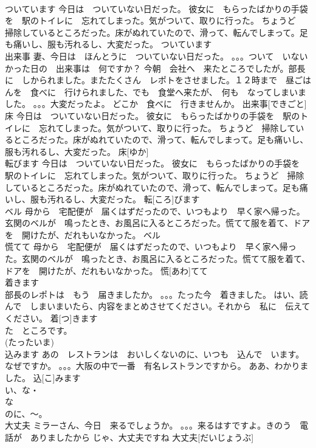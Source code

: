\documentclass[8pt]{extreport}
\begin{document}
\begin{CJK}{UTF8}{min}
\\	ついています	今日は　ついていない日だった。 彼女に　もらったばかりの手袋を　駅のトイレに　忘れてしまった。気がついて、取りに行った。 ちょうど　掃除しているところだった。床がぬれていたので、滑って、転んでしまって。足も痛いし、服も汚れるし、大変だった。	ついています						
\\	出来事	妻、今日は　ほんとうに　ついていない日だった。 。。。ついて　いないかった日の　出来事は　何ですか？ 今朝　会社へ　来たところでしたが。部長に　しかられました。またたくさん　レポトをさせました。１２時まで　昼ごはんを　食べに　行けられました、でも　食堂へ来たが、　何も　なってしまいました。 。。。大変だったよ。 どこか　食べに　行きませんか。	出来事[できごと]			
\\	床	今日は　ついていない日だった。 彼女に　もらったばかりの手袋を　駅のトイレに　忘れてしまった。気がついて、取りに行った。 ちょうど　掃除しているところだった。床がぬれていたので、滑って、転んでしまって。足も痛いし、服も汚れるし、大変だった。	床[ゆか]					
\\	転びます	今日は　ついていない日だった。 彼女に　もらったばかりの手袋を　駅のトイレに　忘れてしまった。気がついて、取りに行った。 ちょうど　掃除しているところだった。床がぬれていたので、滑って、転んでしまって。足も痛いし、服も汚れるし、大変だった。	転[ころ]びます					
\\	ベル	母から　宅配便が　届くはずだったので、いつもより　早く家へ帰った。玄関のベルが　鳴ったとき、お風呂に入るところだった。慌てて服を着て、ドアを　開けたが、だれもいなかった。	ベル						
\\	慌てて	母から　宅配便が　届くはずだったので、いつもより　早く家へ帰った。玄関のベルが　鳴ったとき、お風呂に入るところだった。慌てて服を着て、ドアを　開けたが、だれもいなかった。	慌[あわ]てて			
\\	着きます	
\\	部長のレポトは　もう　届きましたか。 。。。たった今　着きました。 はい、読んで　しまいまいたら、内容をまとめさせてください。それから　私に　伝えてください。	着[つ]きます				
\\	た　ところです。　
\\	(たったいま)	
\\	込みます	あの　レストランは　おいしくないのに、いつも　込んで　います。なぜですか。 。。。大阪の中で一番　有名レストランですから。 ああ、わかりました。	込[こ]みます			
\\	い、な・
\\	な
\\	のに、～。
\\	大丈夫	ミラーさん、今日　来るでしょうか。 。。。来るはすですよ。きのう　電話が　ありましたから じゃ、大丈夫ですね	大丈夫[だいじょうぶ]			

\end{CJK}
\end{document}
